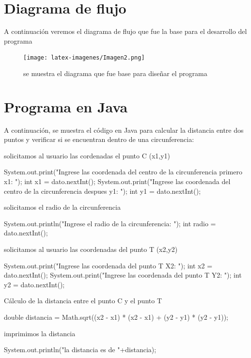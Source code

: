 \documentclass{IEEEcsmag}
\begin{document}
\section{Diagrama de flujo}
A continuación veremos el diagrama de flujo que fue la base para el desarrollo del programa
\begin{figure}[h!]
    \centering
    \texttt{[image: latex-imagenes/Imagen2.png]}
    \caption{se muestra el diagrama que fue base para diseñar el programa}
    \label{fig:diagrama de flujo}
\end{figure}
\section{Programa en Java}
A continuación, se muestra el código en Java para calcular la distancia entre dos puntos y verificar si se encuentran dentro de una circunferencia:


   \begin{javaCode}
       
    public static void main(String[] args) {
        
         Scanner dato = new Scanner(System.in);
        \end{javaCode}
        solicitamos al usuario las cordenadas el punto C (x1,y1)
       \begin{javaCode}
        System.out.print("Ingrese las coordenada del centro de la circunferencia primero x1: ");
        int x1 = dato.nextInt();
        System.out.print("Ingrese las coordenada del centro de la circunferencia despues y1: ");
        int y1 = dato.nextInt();
         \end{javaCode}
         solicitamos el radio de la circunferencia
       
        \begin{javaCode}
        System.out.println("Ingrese el radio de la circunferencia: ");
        int radio = dato.nextInt();
         \end{javaCode}
         
        solicitamos al usuario las coordenadas del punto T (x2,y2)
       \begin{javaCode}
        System.out.print("Ingrese las coordenada del punto T X2: ");
        int x2 = dato.nextInt();
        System.out.print("Ingrese las coordenada del punto T Y2: ");
        int y2 = dato.nextInt();
        \end{javaCode}
         Cálculo de la distancia entre el punto C y el punto T
        \begin{javaCode}
        double distancia = Math.sqrt((x2 - x1) * (x2 - x1) + (y2 - y1) * (y2 - y1));
        \end{javaCode}
         imprimimos la distancia
          \begin{javaCode}
         System.out.println("la distancia es de "+distancia);
          \end{javaCode}
       
\end{document}
